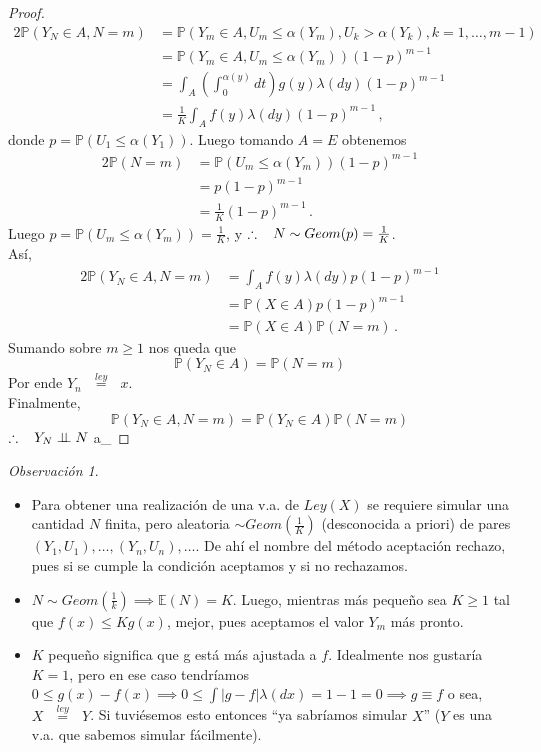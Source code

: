 \documentclass[letterpaper,11pt]{article} %
\def\espacio{\hspace{.25cm}\,}
\theoremstyle{defbreak}
\theoremstyle{propbreak}
\theoremstyle{remark}
\newtheorem{remark}{Observación}[subsection]
\theoremstyle{break}
\def\E{\mathbb{E}}
\def\P{\mathbb{P}}
\newcommand{\indep}{\perp \!\!\! \perp}
\def\beforeitemize{\leavevmode \vspace{-0.5\baselineskip}}
\def\gris{\color{mygray}}
\def\negro{\color{black}}
\def\findem{\null\hfill\color{white}a\color{black}_\square}
\def\igualley{\mbox{ }\overset{ley}{=}\mbox{ }}
\begin{document}
\begin{proof}
\gris 
\begin{alignat*}{2}
    \P(Y_N\in A, N=m) & = \P(Y_m\in A, U_m \leq \alpha(Y_m),U_k>\alpha(Y_k),k=1,\dots,m-1) \\
     & = \P(Y_m\in A,U_m\leq \alpha(Y_m))(1-p)^{m-1} %
     \\&  = \displaystyle \int_A \left(\int^{\alpha(y)}_0 dt\right)g(y)\lambda(dy)(1-p)^{m-1}
     \\ & = \frac{1}{K}\int_Af(y)\lambda(dy)(1-p)^{m-1} \, ,
\end{alignat*}
donde $p=\P(U_1\leq\alpha(Y_1))$. Luego tomando $A=E$ obtenemos
\begin{alignat*}{2}
    \P(N=m) & = \P(U_m \leq \alpha(Y_m))(1-p)^{m-1} \\
     & = p(1-p)^{m-1}
     \\ & = \frac{1}{K}(1-p)^{m-1} \, .
\end{alignat*}
Luego $p=\P(U_m\leq \alpha(Y_m))=\frac{1}{K}$, y $\therefore \espacio N\sim Geom(p)=\frac{1}{K}$.
\\ Así,
\begin{alignat*}{2}
    \P(Y_N\in A, N=m) & = \displaystyle \int_A f(y)\lambda(dy) p(1-p)^{m-1} \\
     & = \P(X\in A)p(1-p)^{m-1}
     \\ & =  \P(X\in A)\P(N=m) \, .
\end{alignat*} 
Sumando sobre $m\geq 1$ nos queda que
$$ \P(Y_N\in A) = \P(N=m)$$
Por ende $Y_n \igualley x$.
\\ Finalmente,
$$ \P(Y_N\in A, N=m) = \P(Y_N\in A)\P(N=m) $$
$\therefore \espacio Y_N\indep N$
\findem \negro
\end{proof}
\begin{remark}
\beforeitemize
\begin{itemize}
    \item Para obtener una realización de una v.a. de $Ley(X)$ se requiere simular una cantidad $N$ finita, pero aleatoria $\sim Geom(\frac{1}{K})$ (desconocida a priori) de pares $(Y_1,U_1),\dots,(Y_n,U_n),\dots$.
    \newline De ahí el nombre del método aceptación rechazo, pues si se cumple la condición aceptamos y si no rechazamos.
    \item $N\sim Geom(\frac{1}{k}) \implies \E(N)=K$. Luego, mientras más pequeño sea $K\geq 1$ tal que $f(x)\leq Kg(x)$, mejor, pues aceptamos el valor $Y_m$ más pronto.
    \item $K$ pequeño significa que g está más ajustada a $f$. Idealmente nos gustaría $K=1$, pero en ese caso tendríamos $0\leq g(x)-f(x)\implies 0\leq\int|g-f|\lambda(dx)=1-1=0\implies g\equiv f$ o sea, $X\igualley Y$. Si tuviésemos esto entonces ``ya sabríamos simular $X$'' ($Y$ es una v.a. que sabemos simular fácilmente).
\end{itemize}
\end{remark}
\end{document}
